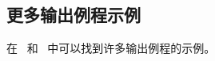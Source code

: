 \documentclass{book}
\begin{document}
\subsection{更多输出例程示例}

在~\cite{Sal1} 和~\cite{Sal2} 中可以找到许多输出例程的示例。



\endofchapter
\end{document}
